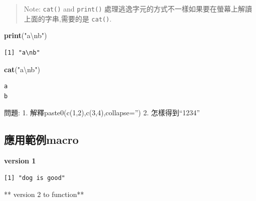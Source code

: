 \documentclass[]{book}
\newenvironment{Shaded}{\begin{snugshade}}{\end{snugshade}}
\newcommand{\CharTok}[1]{\textcolor[rgb]{0.31,0.60,0.02}{#1}}
\newcommand{\ControlFlowTok}[1]{\textcolor[rgb]{0.13,0.29,0.53}{\textbf{#1}}}
\newcommand{\KeywordTok}[1]{\textcolor[rgb]{0.13,0.29,0.53}{\textbf{#1}}}
\newcommand{\NormalTok}[1]{#1}
\newcommand{\StringTok}[1]{\textcolor[rgb]{0.31,0.60,0.02}{#1}}
\theoremstyle{definition}
\theoremstyle{definition}
\theoremstyle{definition}
\theoremstyle{remark}
\begin{document}
\begin{quote}
Note: \texttt{cat()} and \texttt{print()}
處理逃逸字元的方式不一樣如果要在螢幕上解讀上面的字串,需要的是
\texttt{cat()}.
\end{quote}

\begin{Shaded}
\begin{Highlighting}[]
\KeywordTok{print}\NormalTok{(}\StringTok{"a}\CharTok{\textbackslash{}n}\StringTok{b"}\NormalTok{)}
\end{Highlighting}
\end{Shaded}

\begin{verbatim}
[1] "a\nb"
\end{verbatim}

\begin{Shaded}
\begin{Highlighting}[]
\KeywordTok{cat}\NormalTok{(}\StringTok{"a}\CharTok{\textbackslash{}n}\StringTok{b"}\NormalTok{)}
\end{Highlighting}
\end{Shaded}

\begin{verbatim}
a
b
\end{verbatim}

問題: 1. 解釋paste0(c(1,2),c(3,4),collapse='') 2. 怎樣得到``1234''

\hypertarget{macro}{%
\subsection{應用範例macro}\label{macro}}

\textbf{version 1}

\begin{Shaded}
\end{Shaded}

\begin{verbatim}
[1] "dog is good"
\end{verbatim}

** version 2 to function**

\begin{Shaded}
\end{Shaded}
\end{document}
